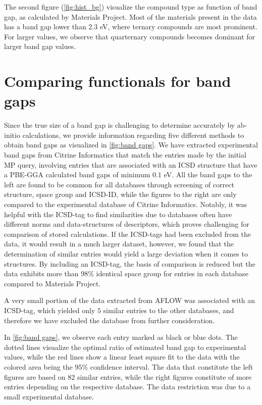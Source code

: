 The second figure (\autoref{fig:hist_bg}) visualize the compound type as function of band gap, as calculated by Materials Project. Most of the materials present in the data has a band gap lower than $2.3$ eV, where ternary compounds are most prominent. For larger values, we observe that quarternary compounds becomes dominant for larger band gap values.

\section{Comparing functionals for band gaps}

Since the true size of a band gap is challenging to determine accurately by ab-initio calculations, we provide information regarding five different methods to obtain band gaps as visualized in \autoref{fig:band gaps}. We have extracted experimental band gaps from Citrine Informatics that match the entries made by the initial MP query, involving entries that are associated with an ICSD structure that have a PBE-GGA calculated band gaps of minimum $0.1$ eV.
All the band gaps to the left are found to be common for all databases through screening of correct structure, space group and ICSD-ID, while the figures to the right are only compared to the experimental database of Citrine Informatics.
Notably, it was helpful with the ICSD-tag to find similarities due to databases often have different norms and data-structures of descriptors, which proves challenging for comparison of stored calculations.
If the ICSD-tags had been excluded from the data, it would result in a much larger dataset, however, we found that the determination of similar entries would yield a large deviation when it comes to structures. By including an ICSD-tag, the basis of comparison is reduced but the data exhibits more than $98\%$ identical space group for entries in each database compared to Materials Project.

A very small portion of the data extracted from AFLOW was associated with an ICSD-tag, which yielded only $5$ similar entries to the other databases, and therefore we have excluded the database from further consideration.

In \autoref{fig:band gaps}, we observe each entry marked as black or blue dots. The dotted lines visualize the optimal ratio of estimated band gap to experimental values, while the red lines show a linear least square fit to the data with the colored area being the $95\%$ confidence interval. The data that constitute the left figures are based on $82$ similar entries, while the right figures constitute of more entries depending on the respective database. The data restriction was due to a small experimental database.

